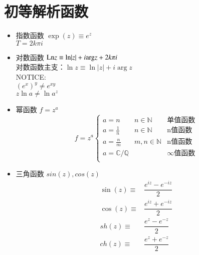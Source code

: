 \documentclass[UTF8,9pt]{ctexart}
\begin{document}
\section{初等解析函数}
    \begin{itemize}
        \item 指数函数 $\exp(z) \equiv e^z$\\
            $T=2k\pi i$
        \item 对数函数 $\mathrm{Ln} z \equiv \mathrm{ln}|z|+i\mathrm{arg} z+2k\pi i$\\
            对数函数主支：$\ln z \equiv \ln|z|+ i \arg z$\\
            NOTICE:\\
            $(e^x)^y \neq e^{xy}$\\
            $z\ln a \neq \ln a^z$
        \item 幂函数 $f=z^a$
            $$f=z^a\left\{ \begin{array}{llr}
                a = n                      & n   \in \mathbb{N} & \text{单值函数}\\
                a = \frac{1}{n}            & n   \in \mathbb{N} & \text{n值函数}\\
                a = \frac{n}{m}            & m,n \in \mathbb{N} & \text{n值函数}\\
                a = \mathbb{C}/\mathbb{Q}  &                    & \infty \text{值函数}\\
            \end{array}\right.$$
        \item 三角函数 $sin(z), cos(z)$\\
            $$\begin{array}{rl}
                \sin(z) \equiv& \dfrac{e^{iz}-e^{-iz}}{2}\\
                \cos(z) \equiv& \dfrac{e^{iz}+e^{-iz}}{2}\\
                sh(z) \equiv& \dfrac{e^{z}-e^{-z}}{2}\\
                ch(z) \equiv& \dfrac{e^{z}+e^{-z}}{2}\\
            \end{array}$$
            
    \end{itemize}
\end{document}
